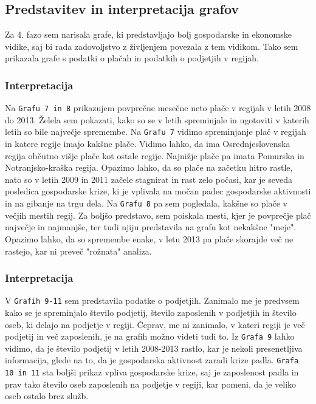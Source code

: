 \documentclass[11pt,a4paper]{article}
\begin{document}
\subsection{Predstavitev in interpretacija grafov}
Za 4. fazo sem narisala grafe, ki predstavljajo bolj gospodarske in ekonomske vidike, saj bi rada zadovoljstvo z življenjem povezala z tem vidikom. Tako sem prikazala grafe s podatki o plačah in podatkih o podjetjih v regijah.

\subsubsection{Interpretacija}
Na \verb+Grafu 7 in 8+ prikazujem povprečne mesečne neto plače v regijah v letih 2008 do 2013. Želela sem pokazati, kako so se v letih spreminjale in ugotoviti v katerih letih so bile največje spremembe. Na \verb+Grafu 7+ vidimo spreminjanje plač v regijah in katere regije imajo kakšne plače. Vidimo lahko, da ima Osrednjeslovenska regija občutno višje plače kot ostale regije. Najnižje plače pa imata Pomurska in Notranjsko-kraška regija. Opazimo lahko, da so plače na začetku hitro rastle, nato so v letih 2009 in 2011 začele stagnirat in rast zelo počasi, kar je seveda posledica gospodarske krize, ki je vplivala na močan padec gospodarske aktivnosti in na gibanje na trgu dela. 
Na \verb+Grafu 8+ pa sem pogledala, kakšne so plače v večjih mestih regij. Za boljšo predstavo, sem poiskala mesti, kjer je povprečje plač največje in najmanjše, ter tudi njiju predstavila na grafu kot nekakšne "meje". Opazimo lahko, da so spremembe enake, v letu 2013 pa plače skorajde več ne rastejo, kar ni preveč "rožnata" analiza.

\subsubsection{Interpretacija}
V \verb+Grafih 9-11+ sem predstavila podatke o podjetjih. Zanimalo me je predvsem kako se je spreminjalo število podjetij, število zaposlenih v podjetjih in število oseb, ki delajo na podjetje v regiji. Čeprav, me ni zanimalo, v kateri regiji je več podjetij in več zaposlenih, je na grafih možno videti tudi to. Iz \verb+Grafa 9+ lahko vidimo, da je število podjetij v letih 2008-2013 rastlo, kar je nekoli presenetljiva informacija, glede na to, da je gospodarska aktivnost zaradi krize padla. \verb+Grafa 10 in 11+ sta boljši prikaz vpliva gospodarske krize, saj je zaposlenost padla in prav tako število oseb zaposlenih na podjetje v regiji, kar pomeni, da je veliko oseb ostalo brez služb. 
\end{document}
